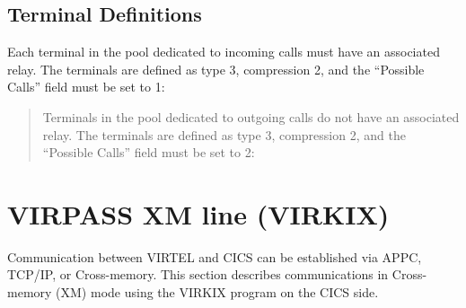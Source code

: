 \documentclass[letterpaper,10pt,english]{sphinxmanual}
\begin{document}

\subsection{Terminal Definitions}
\label{\detokenize{connectivity_guide:id19}}\label{\detokenize{connectivity_guide:index-47}}
Each terminal in the pool dedicated to incoming calls must have an associated relay. The terminals are defined as type 3, compression 2, and the “Possible Calls” field must be set to 1:

\begin{quote}

Terminals in the pool dedicated to outgoing calls do not have an associated relay. The terminals are defined as type 3, compression 2, and the “Possible Calls” field must be set to 2:
\end{quote}


\newpage


\section{VIRPASS XM line (VIRKIX)}
\label{\detokenize{connectivity_guide:index-48}}\label{\detokenize{connectivity_guide:virpass-xm-line-virkix}}
Communication between VIRTEL and CICS can be established via APPC, TCP/IP, or Cross-memory. This section describes communications in Cross-memory (XM) mode using the VIRKIX program on the CICS side.


\end{document}
